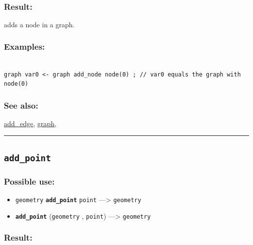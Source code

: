 \documentclass[]{book}
\providecommand{\tightlist}{%
  \setlength{\itemsep}{0pt}\setlength{\parskip}{0pt}}
\theoremstyle{definition}
\theoremstyle{definition}
\theoremstyle{definition}
\theoremstyle{remark}
\begin{document}
\subsubsection{Result:}\label{result-20}

adds a node in a graph.

\subsubsection{Examples:}\label{examples-16}

\begin{verbatim}
 
graph var0 <- graph add_node node(0) ; // var0 equals the graph with node(0)
\end{verbatim}

\subsubsection{See also:}\label{see-also-17}

\href{operators-a-to-a.html\#add_edge}{add\_edge},
\href{operators-d-to-h.html\#graph}{graph},

\begin{center}\rule{0.5\linewidth}{\linethickness}\end{center}

\subsection{\texorpdfstring{\texttt{add\_point}}{add\_point}}\label{add_point}

\subsubsection{Possible use:}\label{possible-use-22}

\begin{itemize}
\tightlist
\item
  \texttt{geometry} \textbf{\texttt{add\_point}} \texttt{point}
  ---\textgreater{} \texttt{geometry}
\item
  \textbf{\texttt{add\_point}} (\texttt{geometry} , \texttt{point})
  ---\textgreater{} \texttt{geometry}
\end{itemize}

\subsubsection{Result:}\label{result-21}
\end{document}
